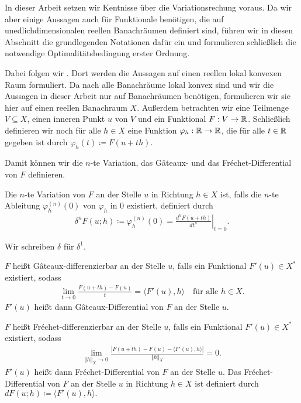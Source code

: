 In dieser Arbeit setzen wir Kentnisse über die Variationsrechung voraus. 
Da wir aber einige Aussagen auch für Funktionale benötigen, die auf
unedlichdimensionalen reellen Banachräumen definiert sind, führen
wir in diesen Abschnitt die grundlegenden Notationen dafür ein und formulieren
schließlich die notwendige Optimalitätsbedingung erster Ordnung.

Dabei folgen wir \cite[S. 189-194]{Zei85}. 
Dort werden die Aussagen auf einen reellen lokal konvexen
Raum formuliert. Da nach \cite[S. 781, (43)]{Zei86} alle Banachräume 
lokal konvex sind und wir die Aussagen in dieser Arbeit
nur auf Banachräumen benötigen, formulieren wir sie hier auf einen reellen 
Banachraum $X$. 
Außerdem betrachten wir eine Teilmenge $V\subseteq X$, einen
inneren Punkt $u$ von $V$ und ein Funktional $F:V\to\mathbb{R}$. 
Schließlich definieren wir noch für alle $h\in X$ eine Funktion
$\varphi_h:\mathbb{R}\to\mathbb{R}$, die für alle $t\in\mathbb{R}$ gegeben ist durch
$\varphi_h(t)\coloneqq F(u+th)$.

Damit können wir die $n$-te Variation, das G\^ateaux- und das 
Fr\'echet-Differential von $F$ definieren.

\begin{definition}[$n$-te Variation]
  Die $n$-te Variation von $F$ an der Stelle $u$ in Richtung $h\in X$ ist,
  falls die $n$-te Ableitung $\varphi_h^{(n)}(0)$ von $\varphi_h$ in $0$
  existiert, definiert durch 
  \begin{align*}
    \delta^n F(u;h)\coloneqq \varphi_h^{(n)}(0)=
    \left. \frac{d^n F(u+th)}{dt^n}\right|_{t=0}.
  \end{align*}

  Wir schreiben $\delta$ für $\delta^1$.
\end{definition}

\begin{definition}
  $F$ heißt G\^ateaux-differenzierbar an der Stelle $u$, falls ein 
  Funktional $F'(u)\in X^\ast$ existiert, sodass
  \begin{align*}
    \lim_{t\to 0}\frac{F(u+th)-F(u)}{t} = \langle F'(u), h\rangle\quad
    \text{für alle } h\in X.
  \end{align*}
  $F'(u)$ heißt dann G\^ateaux-Differential von $F$ an der Stelle $u$.

  $F$ heißt Fr\'echet-differenzierbar an der Stelle $u$, falls ein Funktional
  $F'(u)\in X^\ast$ existiert, sodass
  \begin{align*}
    \lim_{\Vert h\Vert_X\to 0}\frac{|F(u+th)-F(u)-
    \langle F'(u),h\rangle|}{\Vert h\Vert_X} =0.
  \end{align*}
  $F'(u)$ heißt dann Fr\'echet-Differential von $F$ an der Stelle $u$.
  Das Fr\'echet-Differential von $F$ an der Stelle $u$ in Richtung $h\in X$
  ist definiert durch $dF(u;h)\coloneqq \langle F'(u),h\rangle.$
\end{definition}

